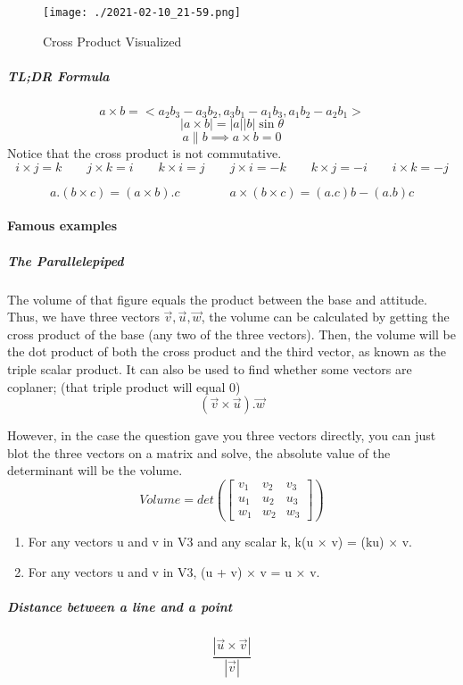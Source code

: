 \documentclass{article}
\begin{document}
	\begin{figure}[h!]
		\texttt{[image: ./2021-02-10\_21-59.png]}
		\caption{Cross Product Visualized}
	\end{figure}

	\subparagraph{TL;DR Formula}
	\[
		a\times b = <a_2b_3-a_3b_2,a_3b_1-a_1b_3,a_1b_2-a_2b_1> 
	\]
	\[
		|a\times b|
		= |a||b| \sin{ \theta } 
	\]
	\[
		a \parallel b \implies a \times b = 0 
	\]
	Notice that the cross product is not commutative.
	\[
		i \times j = k  \qquad j \times k = i \qquad k \times i = j \qquad j \times i = -k \qquad k \times j = -i \qquad i \times k = -j 
	\]

	\[
		a . (b \times c) = (a \times b) . c \qquad \qquad a \times (b \times c ) = (a.c)b - (a.b)c 
	\]

	\newpage

	\paragraph{Famous examples}
	\subparagraph{The Parallelepiped}
	The volume of that figure equals the product between the base and attitude. Thus, we have three vectors $ \vec{ v }, \vec{ u }, \vec{ w } $, the volume can be calculated by getting the cross product of the base (any two of the three vectors). Then, the volume will be the dot product of both the cross product and the third vector, as known as the triple scalar product.
	It can also be used to find whether some vectors are coplaner; (that triple product will equal 0)
	\begin{equation*}
		( \vec{ v } \times \vec{ u } ) . \vec{ w }
	\end{equation*}

	However, in the case the question gave you three vectors directly, you can just blot the three vectors on a matrix and solve, the absolute value of the determinant will be the volume.
	\begin{equation*}
		Volume = det \left( \left [
			\begin{matrix}
				v_1&v_2&v_3\\u_1&u_2&u_3\\w_1&w_2&w_3
			\end{matrix}
			\right]
		\right)
	\end{equation*}

	\begin{enumerate}[1.]
		\item For any vectors u and v in V3 and any scalar k, k(u × v) = (ku) × v.
		\item For any vectors u and v in V3, (u + v) × v = u × v.

	\end{enumerate}
	\subparagraph{Distance between a line and a point}
	\[
		\frac{| \vec{ u } \times \vec{ v }| }{ | \vec{ v } | } 
	\]
\end{document}
